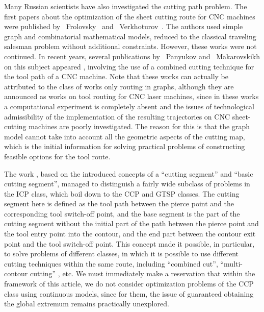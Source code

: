 Many Russian scientists have also investigated the cutting path problem. The first papers about the optimization of the sheet cutting route for CNC machines
were published by ~Frolovsky~\cite{bibx:104}
and ~Verkhoturov~\cite{bibx:105}.
The authors used simple graph and combinatorial mathematical models,
reduced to the classical traveling salesman problem without additional constraints.
However, these works were not continued.
In recent years, several publications by ~Panyukov
and ~Makarovskikh on this subject appeared
\cite{bibx:106,bibx:107,bibx:108},
involving the use of a combined cutting technique
for the tool path of a CNC machine.
Note that these works can actually be attributed to the class of works only routing in graphs, although they are announced as works on tool routing for CNC laser machines, since in these works a computational experiment is completely absent
and the issues of technological admissibility of the implementation of the resulting trajectories on CNC sheet-cutting machines are poorly investigated.
The reason for this is that the graph model
cannot take into account all the geometric aspects of the cutting map, which is the initial information for solving practical problems of constructing feasible options for the tool route.


The work \cite{bibx:308,bibx:112},
based on the introduced concepts of a ``cutting segment''
and ``basic cutting segment'',
managed to distinguish a fairly wide subclass of problems in the ICP class,
which boil down to the CCP and GTSP classes.
The cutting segment here is defined as the tool path between the pierce point and the corresponding tool switch-off point, and the base segment is the part of the cutting segment without the initial part of the path between the pierce point and the tool entry point into the contour, and the end part between the contour exit point and the tool switch-off point.
This concept made it possible, in particular,
to solve problems of different classes,
in which it is possible to use different cutting techniques within the same route,
including ``combined cut'', ``multi-contour cutting''
\cite[part I] {4}, etc.
We must immediately make a reservation that within the framework of this article, we do not consider optimization problems of the CCP class using continuous models,
since for them, the issue of guaranteed obtaining the global extremum remains practically unexplored.

